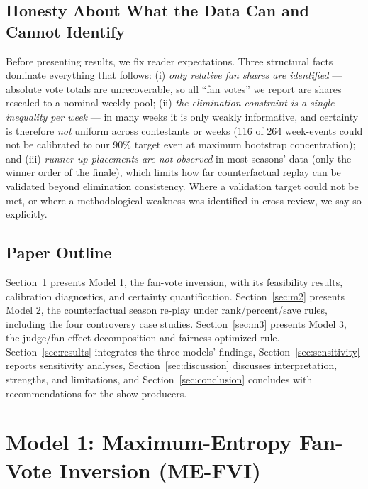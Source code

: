 \documentclass[11pt]{article}
\begin{document}
\subsection{Honesty About What the Data Can and Cannot Identify}

Before presenting results, we fix reader expectations. Three structural facts dominate
everything that follows: (i) \emph{only relative fan shares are identified} --- absolute
vote totals are unrecoverable, so all ``fan votes'' we report are shares rescaled to a
nominal weekly pool; (ii) \emph{the elimination constraint is a single inequality per
week} --- in many weeks it is only weakly informative, and certainty is therefore
\emph{not} uniform across contestants or weeks (116 of 264 week-events could not be
calibrated to our 90\% target even at maximum bootstrap concentration); and (iii)
\emph{runner-up placements are not observed} in most seasons' data (only the winner order
of the finale), which limits how far counterfactual replay can be validated beyond
elimination consistency. Where a validation target could not be met, or where a
methodological weakness was identified in cross-review, we say so explicitly.

\subsection{Paper Outline}

Section~\ref{sec:m1} presents Model 1, the fan-vote inversion, with its feasibility
results, calibration diagnostics, and certainty quantification. Section~\ref{sec:m2}
presents Model 2, the counterfactual season re-play under rank/percent/save rules,
including the four controversy case studies. Section~\ref{sec:m3} presents Model 3, the
judge/fan effect decomposition and fairness-optimized rule. Section~\ref{sec:results}
integrates the three models' findings, Section~\ref{sec:sensitivity} reports sensitivity
analyses, Section~\ref{sec:discussion} discusses interpretation, strengths, and
limitations, and Section~\ref{sec:conclusion} concludes with recommendations for the show
producers.

\section{Model 1: Maximum-Entropy Fan-Vote Inversion (ME-FVI)}
\label{sec:m1}
\end{document}
